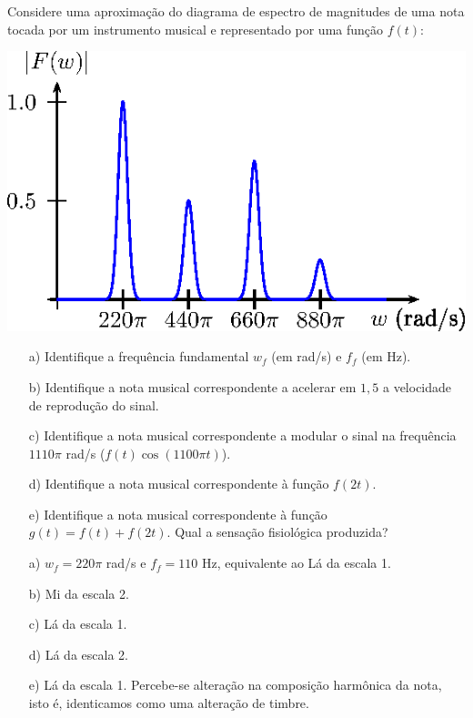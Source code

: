 \begin{exer} Considere uma aproximação do diagrama de espectro de magnitudes de uma nota tocada por um instrumento musical e representado por uma função $f(t)$:
\begin{center}
\includegraphics{cap_propriedades_transformada/pics/figura_24}\end{center}
\begin{itemize}
 \item[a)] Identifique a frequência fundamental $w_f$ (em rad/s) e $f_f$ (em Hz).
 \item[b)] Identifique a nota musical correspondente a acelerar em $1,5$ a velocidade de reprodução do sinal.
 \item[c)] Identifique a nota musical correspondente a modular o sinal na frequência $1110\pi$ rad/s ($f(t)\cos(1100\pi t)$).
 \item[d)] Identifique a nota musical correspondente à função $f(2t)$.
 \item[e)] Identifique a nota musical correspondente à função $g(t)=f(t)+f(2t)$. Qual a sensação fisiológica produzida?
 \end{itemize}
\end{exer}
\begin{resp}
\begin{itemize}
 \item[a)] $w_f=220\pi$ rad/s e $f_f=110$ Hz, equivalente ao Lá da escala 1.
 \item[b)] Mi da escala 2.
 \item[c)] Lá da escala 1.
 \item[d)] Lá da escala 2.
 \item[e)] Lá da escala 1. Percebe-se alteração na composição harmônica da nota, isto é, identicamos como uma alteração de timbre.
 \end{itemize}
\end{resp}


